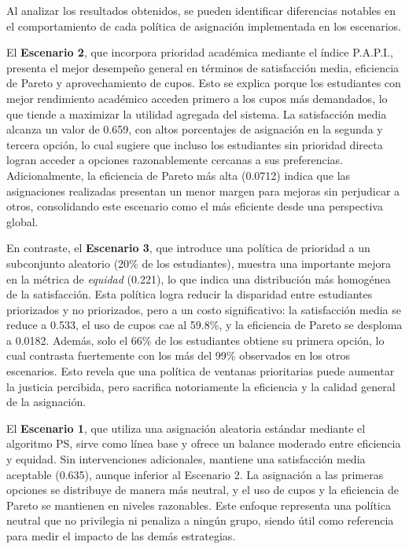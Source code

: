 \documentclass{article}
\begin{document}
\noindent Al analizar los resultados obtenidos, se pueden identificar diferencias notables en el comportamiento de cada política de asignación implementada en los escenarios.

El \textbf{Escenario 2}, que incorpora prioridad académica mediante el índice P.A.P.I., presenta el mejor desempeño general en términos de satisfacción media, eficiencia de Pareto y aprovechamiento de cupos. Esto se explica porque los estudiantes con mejor rendimiento académico acceden primero a los cupos más demandados, lo que tiende a maximizar la utilidad agregada del sistema. La satisfacción media alcanza un valor de 0.659, con altos porcentajes de asignación en la segunda y tercera opción, lo cual sugiere que incluso los estudiantes sin prioridad directa logran acceder a opciones razonablemente cercanas a sus preferencias. Adicionalmente, la eficiencia de Pareto más alta (0.0712) indica que las asignaciones realizadas presentan un menor margen para mejoras sin perjudicar a otros, consolidando este escenario como el más eficiente desde una perspectiva global.

En contraste, el \textbf{Escenario 3}, que introduce una política de prioridad a un subconjunto aleatorio (20\% de los estudiantes), muestra una importante mejora en la métrica de \textit{equidad} (0.221), lo que indica una distribución más homogénea de la satisfacción. Esta política logra reducir la disparidad entre estudiantes priorizados y no priorizados, pero a un costo significativo: la satisfacción media se reduce a 0.533, el uso de cupos cae al 59.8\%, y la eficiencia de Pareto se desploma a 0.0182. Además, solo el 66\% de los estudiantes obtiene su primera opción, lo cual contrasta fuertemente con los más del 99\% observados en los otros escenarios. Esto revela que una política de ventanas prioritarias puede aumentar la justicia percibida, pero sacrifica notoriamente la eficiencia y la calidad general de la asignación.

El \textbf{Escenario 1}, que utiliza una asignación aleatoria estándar mediante el algoritmo PS, sirve como línea base y ofrece un balance moderado entre eficiencia y equidad. Sin intervenciones adicionales, mantiene una satisfacción media aceptable (0.635), aunque inferior al Escenario 2. La asignación a las primeras opciones se distribuye de manera más neutral, y el uso de cupos y la eficiencia de Pareto se mantienen en niveles razonables. Este enfoque representa una política neutral que no privilegia ni penaliza a ningún grupo, siendo útil como referencia para medir el impacto de las demás estrategias.
\end{document}
